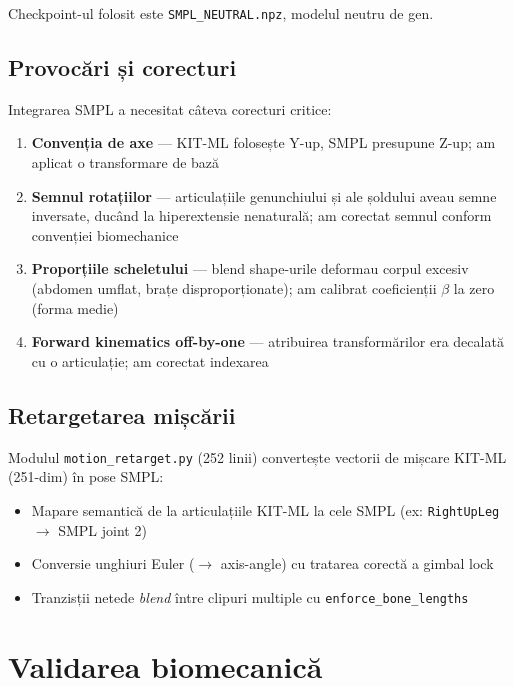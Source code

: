 Checkpoint-ul folosit este \texttt{SMPL\_NEUTRAL.npz}, modelul neutru de gen.

\subsection{Provocări și corecturi}

Integrarea SMPL a necesitat câteva corecturi critice:

\begin{enumerate}
    \item \textbf{Convenția de axe} --- KIT-ML folosește Y-up, SMPL presupune Z-up; am aplicat o transformare de bază
    \item \textbf{Semnul rotațiilor} --- articulațiile genunchiului și ale șoldului aveau semne inversate, ducând la hiperextensie nenaturală; am corectat semnul conform convenției biomechanice
    \item \textbf{Proporțiile scheletului} --- blend shape-urile deformau corpul excesiv (abdomen umflat, brațe disproporționate); am calibrat coeficienții $\beta$ la zero (forma medie)
    \item \textbf{Forward kinematics off-by-one} --- atribuirea transformărilor era decalată cu o articulație; am corectat indexarea
\end{enumerate}

\subsection{Retargetarea mișcării}

Modulul \texttt{motion\_retarget.py} (252 linii) convertește vectorii de mișcare KIT-ML (251-dim) în pose SMPL:
\begin{itemize}
    \item Mapare semantică de la articulațiile KIT-ML la cele SMPL (ex: \texttt{RightUpLeg} $\rightarrow$ SMPL joint 2)
    \item Conversie unghiuri Euler ($\rightarrow$ axis-angle) cu tratarea corectă a gimbal lock
    \item Tranzisții netede \textit{blend} între clipuri multiple cu \texttt{enforce\_bone\_lengths}
\end{itemize}

\section{Validarea biomecanică}

